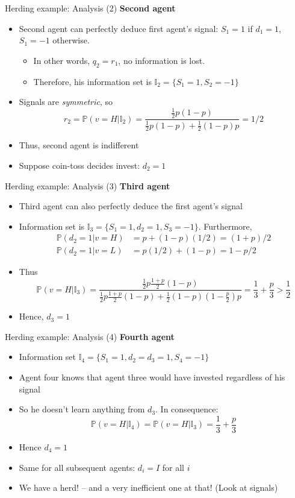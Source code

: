 \documentclass[english,10pt
,aspectratio=169
]{beamer}
\begin{document}
\begin{frame}{Herding example: Analysis (2)}
	\textbf{Second agent}
	\begin{itemize}
		\item Second agent can perfectly deduce first agent's signal: $S_1=1$ if $d_1=1$, $S_1=-1$ otherwise.
		\begin{itemize}
			\item In other words, $q_2 = r_1$, no information is lost.
			\item Therefore, his information set is $\mathbb{I}_2=\{S_1=1,S_2=-1\}$
		\end{itemize}
		\item Signals are \emph{symmetric}, so
		\[ r_2 = \mathbb{P}(v=H|\mathbb{I}_2)	 = \frac{\frac{1}{2} p(1-p)}{\frac{1}{2} p(1-p)+\frac{1}{2} (1-p)p} = 1/2 \]
		\item Thus, second agent is indifferent
		\item Suppose coin-toss decides invest: $d_2=1$
	\end{itemize}
\end{frame}


\begin{frame}{Herding example: Analysis (3)}
	\textbf{Third agent}
	\begin{itemize}
		\item Third agent can also perfectly deduce the first agent's signal
		\item Information set is $\mathbb{I}_3=\{S_1=1, d_2=1, S_3=-1\}$. Furthermore,  
		\begin{align*}
		\mathbb{P}(d_2=1|v=H)	&=p +(1-p) (1/2)=(1+p)/2\\
		\mathbb{P}(d_2=1|v=L)	& =p(1/2) +(1-p)=1-p/2
		\end{align*}
		\item Thus
		\[
			\mathbb{P}(v=H|\mathbb{I}_3) 	
			 = \frac{\frac{1}{2}p \frac{1+p}{2}(1-p)}{\frac{1}{2}p\frac{1+p}{2}(1-p)+\frac{1}{2}(1-p)(1-\frac{p}{2})p} 
			=\frac{1}{3} + \frac{p}{3}>\frac{1}{2}
		\]
		\item Hence, $d_3=1$
	\end{itemize}
\end{frame}


\begin{frame}{Herding example: Analysis (4)}
	\textbf{Fourth agent}
	\begin{itemize}
		\item Information set   $\mathbb{I}_4=\{S_1=1,d_2=d_3=1, S_4=-1\}$
		\item Agent four knows that agent three would have invested regardless of his signal
		\item So he doesn't learn anything from $d_3$. In consequence:
		\[
		\mathbb{P}(v=H|\mathbb{I}_4) =\mathbb{P}(v=H|\mathbb{I}_3) 	=\frac{1}{3} + \frac{p}{3}		
		\]
		\item Hence $d_4=1$
		\item Same for all subsequent agents: $d_i=I$ for all $i$
		\item We have a herd! -- and a very inefficient one at that! (Look at signals) \hyperlink{HERD}{}
	\end{itemize}
\end{frame}
\end{document}

